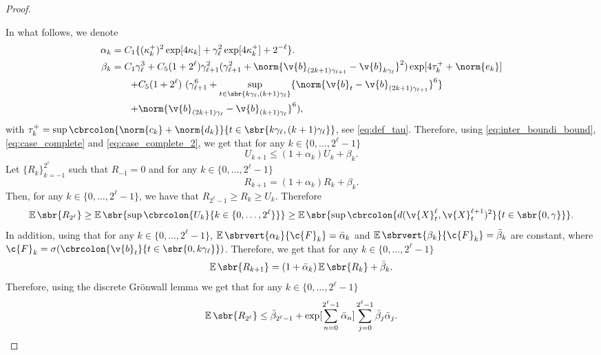 \begin{proof}{}{}
\begin{enumerate}[wide, labelindent=0pt, label=(\alph*)]
	\end{enumerate}
	In what follows, we denote \begin{align} \alpha_k & = C_1\{ (\kappa_k^+)^2 \exp[4 \kappa_k] + \gamma_\ell^2 \exp[4\kappa_k^+] + 2^{-\ell} \} .
              \\
              \beta_k  & =  C_1  \gamma_\ell^3 + C_5 (1 + 2^\ell) \gamma_{\ell+1}^2  (\gamma_{\ell+1}^2 + \norm{\v{b}_{(2k+1)\gamma_{\ell+1}} - \v{b}_{k\gamma_{\ell}}}^2)\exp[4 \tau_k^+ + \norm{e_k}] \\
                       & \qquad { +  C_5 (1 + 2^\ell) \ (\gamma_{\ell+1}^6 + \sup_{t \in \sbr{k\gamma_\ell, (k+1) \gamma_\ell}} \{\norm{\v{b}_{t} - \v{b}_{(2k+1) \gamma_{\ell+1}}}^6\}}      \\ & \qquad { + \norm{\v{b}_{(2k+1) \gamma_{\ell}} - \v{b}_{(k+1) \gamma_{\ell}}}^6)  , }
	\end{align}
	with
	$\tau_k^+ = \sup \cbrcolon{\norm{c_k} + \norm{d_k}}{t \in
			\sbr{k \gamma_\ell, (k+1) \gamma_\ell}}$, see \eqref{eq:def_tau}.
	Therefore, using \eqref{eq:inter_boundi_bound}, \eqref{eq:case_complete} and \eqref{eq:case_complete_2}, we get that for any \(k \in \{0, \dots, 2^\ell -1\}\) \begin{equation} U_{k+1} \leq (1 + \alpha_k) U_k + \beta_k .
	\end{equation}
	Let \(\{R_k\}_{k=-1}^{2^\ell}\) such that \(R_{-1}=0\) and for any \(k \in \{0, \dots, 2^{\ell}-1\}\) \begin{equation} R_{k+1} = (1 + \alpha_k) R_k + \beta_k .
	\end{equation}
	Then, for any \(k \in \{0, \dots, 2^{\ell}-1\}\), we have that \(R_{2^\ell -1} \geq R_k \ge U_k\).
	Therefore \begin{equation} \label{eq:bound_sup} \E\sbr{R_{2^\ell}} \geq \E\sbr{\sup \cbrcolon{U_k}{k \in \{0, \dots, 2^\ell\}}} \geq \E\sbr{\sup \cbrcolon{d(\v{X}_t^\ell, \v{X}_t^{\ell+1})^2}{t \in \sbr{0,\gamma}}} .
	\end{equation}
	In addition, using that for any \(k \in \{0, \dots, 2^\ell - 1\}\), \(\E\sbrvert{\alpha_k}{\c{F}_k} = \bar{\alpha}_k\) and \(\E\sbrvert{\beta_k}{\c{F}_k} = \bar{\beta}_k\) are constant, where \(\c{F}_k = \sigma(\cbrcolon{\v{b}_t}{t \in \sbr{0, k \gamma_\ell}})\).
	Therefore, we get that for any \(k \in \{0, \dots, 2^\ell - 1\}\) \begin{equation} \E\sbr{R_{k+1}} = (1 + \bar{\alpha}_k) \E\sbr{R_k} + \bar{\beta}_k .
	\end{equation}
	Therefore, using the discrete Gr\"onwall lemma we get that for any \(k \in \{0, \dots, 2^{\ell}-1\}\) \begin{equation} { \E\sbr{R_{2^\ell}} \leq \bar{\beta}_{2^{\ell}-1} + \exp[\sum_{n=0}^{2^\ell - 1} \bar{\alpha}_n] \sum_{j=0}^{2^\ell - 1} \bar{\beta}_j \bar{\alpha}_j .
		}

\end{equation}
\end{proof}
